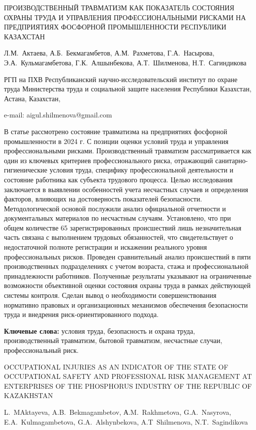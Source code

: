 \begin{header}
ПРОИЗВОДСТВЕННЫЙ ТРАВМАТИЗМ КАК ПОКАЗАТЕЛЬ СОСТОЯНИЯ ОХРАНЫ ТРУДА И УПРАВЛЕНИЯ ПРОФЕССИОНАЛЬНЫМИ РИСКАМИ НА ПРЕДПРИЯТИЯХ ФОСФОРНОЙ ПРОМЫШЛЕННОСТИ РЕСПУБЛИКИ КАЗАХСТАН

Л.М.~Актаева,
А.Б.~Бекмагамбетов,
А.М.~Рахметова,
Г.А.~Насырова,
Э.А.~Кульмагамбетова,
Г.К.~Алшынбекова,
А.Т.~Шилменова\envelope,
Н.Т.~Сагиндикова
\end{header}

\begin{affil}
РГП на ПХВ Республиканский научно-исследовательский институт по охране труда Министерства труда и социальной защите населения Республики Казахстан, Астана, Казахстан,

e-mail: aigul.shilmenova@gmail.com
\end{affil}

В статье рассмотрено состояние травматизма на предприятиях фосфорной
промышленности в 2024 г. С позиции оценки условий труда и управления
профессиональными рисками. Производственный травматизм рассматривается
как один из ключевых критериев профессионального риска, отражающий
санитарно-гигиенические условия труда, специфику профессиональной
деятельности и состояние работника как субъекта трудового процесса.
Целью исследования заключается в выявлении особенностей учета несчастных
случаев и определения факторов, влияющих на достоверность показателей
безопасности. Методологической основой послужили анализ официальной
отчетности и документальных материалов по несчастным случаям.
Установлено, что при общем количестве 65 зарегистрированных происшествий
лишь незначительная часть связана с выполнением трудовых обязанностей,
что свидетельствует о недостаточной полноте регистрации и искажении
реального уровня профессиональных рисков. Проведен сравнительный анализ
происшествий в пяти производственных подразделениях с учетом возраста,
стажа и профессиональной принадлежности работников. Полученные
результаты указывают на ограниченные возможности объективной оценки
состояния охраны труда в рамках действующей системы контроля. Сделан
вывод о необходимости совершенствования нормативно правовых и
организационных механизмов обеспечения безопасности труда и внедрения
риск-ориентированного подхода.

{\bfseries Ключевые слова:} условия труда, безопасность и охрана труда,
производственный травматизм, бытовой травматизм, несчастные случаи,
профессиональный риск.

\begin{header}
OCCUPATIONAL INJURIES AS AN INDICATOR OF THE STATE OF OCCUPATIONAL SAFETY AND PROFESSIONAL RISK MANAGEMENT AT ENTERPRISES OF THE PHOSPHORUS INDUSTRY OF THE REPUBLIC OF KAZAKHSTAN

L.~MAktayeva,
A.B.~Bekmagambetov,
А.M.~Rakhmetova,
G.A.~Nasyrova,
E.A.~Kulmagambetova,
G.A.~Alshynbekova,
A.T~Shilmenova\envelope,
N.T.~Sagindikova
\end{header}


